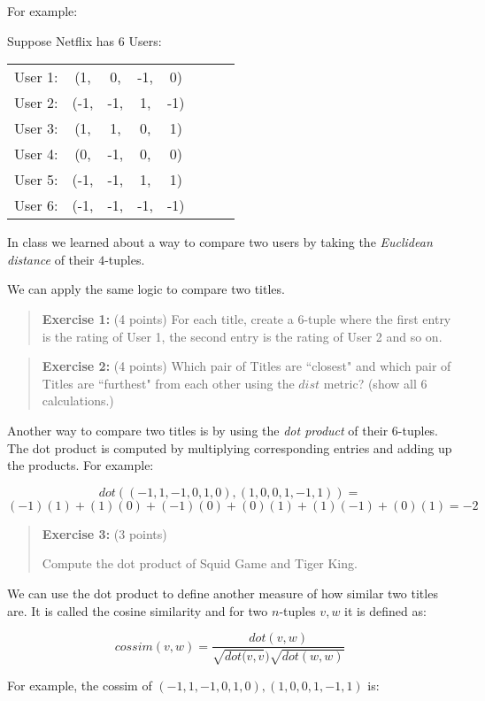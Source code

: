 \documentclass[10pt,letterpaper,unboxed,cm]{article}
\begin{document}
\begin{enumerate}
For example:

Suppose Netflix has 6 Users:

\begin{tabular}{cccccccc}
User 1: &(1,&0,&-1,&0)\\
User 2: &(-1,&-1,&1,&-1)\\
User 3: &(1,&1,&0,&1)\\
User 4: &(0,&-1,&0,&0)\\
User 5: &(-1,&-1,&1,&1)\\
User 6: &(-1,&-1,&-1,&-1)
\end{tabular}

In class we learned about a way to compare two users by taking the \emph{Euclidean distance} of their $4$-tuples.

We can apply the same logic to compare two titles.



\begin{quote}
{\bf Exercise 1:} (4 points) For each title, create a $6$-tuple where the first entry is the rating of User 1, the second entry is the rating of User 2 and so on.
\end{quote}

\begin{quote}
{\bf Exercise 2:} (4 points) Which pair of Titles are ``closest" and which pair of Titles are ``furthest" from each other using the $dist$ metric? (show all 6 calculations.)
\end{quote}

Another way to compare two titles is by using the \emph{dot product} of their $6$-tuples. The dot product is computed by multiplying corresponding entries and adding up the products. For example:

$$dot((-1,1,-1,0,1,0),(1,0,0,1,-1,1))=$$
$$(-1)(1)+(1)(0)+(-1)(0)+(0)(1)+(1)(-1)+(0)(1)=-2$$


\begin{quote}
{\bf Exercise 3:} (3 points)

Compute the dot product of Squid Game and Tiger King.

\end{quote}

We can use the dot product to define another measure of how similar two titles are. It is called the cosine similarity and for two $n$-tuples $v,w$ it is defined as:

$$cossim(v,w) = \frac{dot(v,w)}{\sqrt{dot(v,v})\sqrt{dot(w,w)}}$$

For example, the cossim of $(-1,1,-1,0,1,0),(1,0,0,1,-1,1)$ is:


\end{enumerate}
\end{document}
